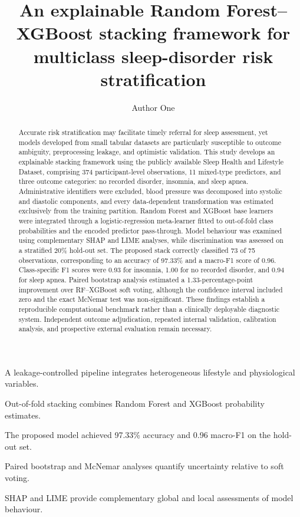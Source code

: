 ﻿\documentclass[preprint,12pt]{elsarticle}
\begin{document}
\begin{frontmatter}
\title{An explainable Random Forest--XGBoost stacking framework for multiclass sleep-disorder risk stratification}
\author[bracu]{Author One}
\address[bracu]{Department of Computer Science and Engineering, BRAC University, Dhaka, Bangladesh}

\begin{abstract}
Accurate risk stratification may facilitate timely referral for sleep assessment, yet models developed from small tabular datasets are particularly susceptible to outcome ambiguity, preprocessing leakage, and optimistic validation. This study develops an explainable stacking framework using the publicly available Sleep Health and Lifestyle Dataset, comprising 374 participant-level observations, 11 mixed-type predictors, and three outcome categories: no recorded disorder, insomnia, and sleep apnea. Administrative identifiers were excluded, blood pressure was decomposed into systolic and diastolic components, and every data-dependent transformation was estimated exclusively from the training partition. Random Forest and XGBoost base learners were integrated through a logistic-regression meta-learner fitted to out-of-fold class probabilities and the encoded predictor pass-through. Model behaviour was examined using complementary SHAP and LIME analyses, while discrimination was assessed on a stratified 20\% hold-out set. The proposed stack correctly classified 73 of 75 observations, corresponding to an accuracy of 97.33\% and a macro-F1 score of 0.96. Class-specific F1 scores were 0.93 for insomnia, 1.00 for no recorded disorder, and 0.94 for sleep apnea. Paired bootstrap analysis estimated a 1.33-percentage-point improvement over RF--XGBoost soft voting, although the confidence interval included zero and the exact McNemar test was non-significant. These findings establish a reproducible computational benchmark rather than a clinically deployable diagnostic system. Independent outcome adjudication, repeated internal validation, calibration analysis, and prospective external evaluation remain necessary.
\end{abstract}

\begin{highlights}
\item A leakage-controlled pipeline integrates heterogeneous lifestyle and physiological variables.
\item Out-of-fold stacking combines Random Forest and XGBoost probability estimates.
\item The proposed model achieved 97.33\% accuracy and 0.96 macro-F1 on the hold-out set.
\item Paired bootstrap and McNemar analyses quantify uncertainty relative to soft voting.
\item SHAP and LIME provide complementary global and local assessments of model behaviour.
\end{highlights}


\end{frontmatter}
\end{document}
